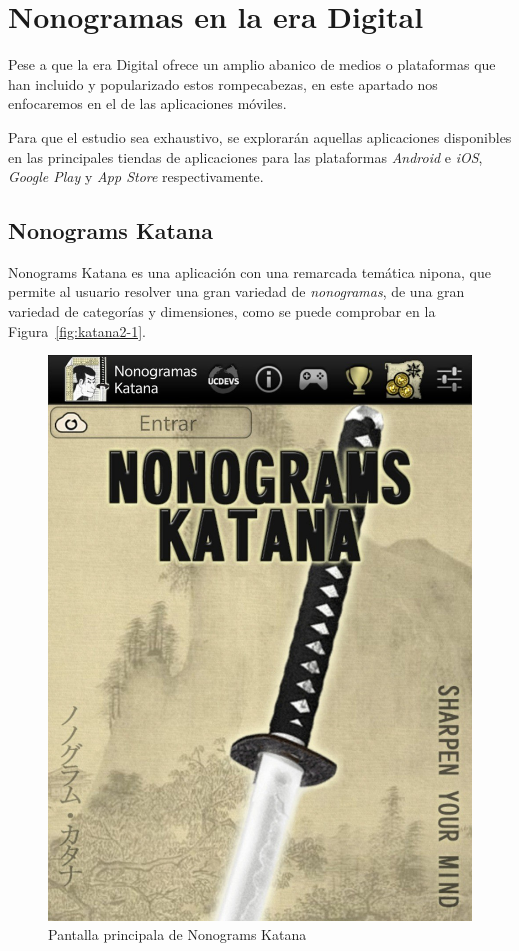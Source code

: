 \documentclass[11pt,spanish,listoffigures,listoftables]{tfgetsinf}
\begin{document}
\section{Nonogramas en la era Digital}

Pese a que la era Digital ofrece un amplio abanico de medios o plataformas que han incluido y popularizado estos rompecabezas, en
este apartado nos enfocaremos en el de las aplicaciones móviles.

Para que el estudio sea exhaustivo, se explorarán aquellas aplicaciones disponibles en las principales tiendas de aplicaciones para 
las plataformas \textit{Android} e \textit{iOS}, \textit{Google Play} y \textit{App Store} respectivamente.

\subsection{Nonograms Katana}
Nonograms Katana es una aplicación con una remarcada temática nipona, que permite al usuario resolver una gran variedad de \textit{nonogramas},
de una gran variedad de categorías y dimensiones, como se puede comprobar en la Figura~\ref{fig:katana2-1}.

\begin{figure}[H]
   \centering
   \includegraphics[scale=.15]{images/nonokatana1.jpg}
   \caption{Pantalla principala de Nonograms Katana}
   \label{fig:katana1}
 \end{figure}
\end{document}
